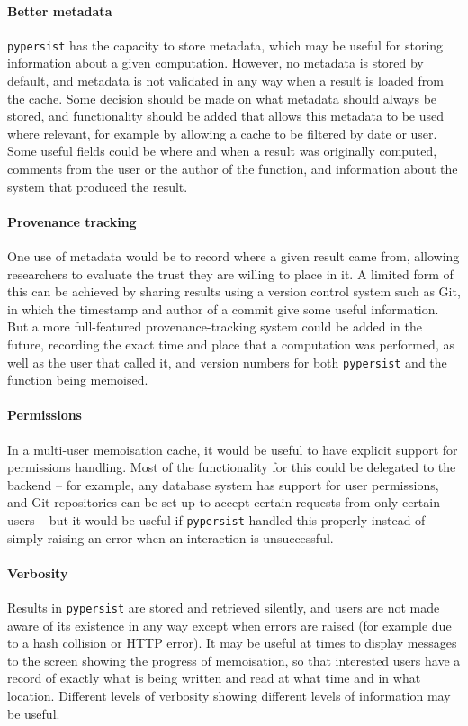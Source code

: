 \documentclass{deliverablereport}
\newcommand{\pypersist}{\texttt{pypersist}}
\begin{document}
\paragraph{Better metadata}
\pypersist{} has the capacity to store metadata, which may be useful for storing
information about a given computation.  However, no
metadata is stored by default, and metadata is not validated in any way when a
result is loaded from the cache.  Some decision should be made on what metadata
should always be stored, and functionality should be added that allows this
metadata to be used where relevant, for example by allowing a cache to be
filtered by date or user.
Some useful fields could be where and when a result was originally computed,
comments from the user or the author of the function, and information about the
system that produced the result.

\paragraph{Provenance tracking}
One use of metadata would be to record where a given result came from, allowing
researchers to evaluate the trust they are willing to place in it.  A limited
form of this can be achieved by sharing results using a version control system
such as Git, in which the timestamp and author of a commit give some useful
information.  But a more full-featured provenance-tracking system could be added
in the future, recording the exact time and place that a computation was
performed, as well as the user that called it, and version numbers for both
\pypersist{} and the function being memoised.

\paragraph{Permissions}
In a multi-user memoisation cache, it would be useful to have explicit support
for permissions handling.  Most of the functionality for this could be delegated
to the backend -- for example, any database system has support for user
permissions, and Git repositories can be set up to accept certain requests from
only certain users -- but it would be useful if \pypersist{} handled this
properly instead of simply raising an error when an interaction is unsuccessful.

\paragraph{Verbosity}
Results in \pypersist{} are stored and retrieved silently, and users are not
made aware of its existence in any way except when errors are raised (for
example due to a hash collision or HTTP error).  It may be useful at times to
display messages to the screen showing the progress of memoisation, so that
interested users have a record of exactly what is being written and read at what
time and in what location.  Different levels of verbosity showing different
levels of information may be useful.
\end{document}
